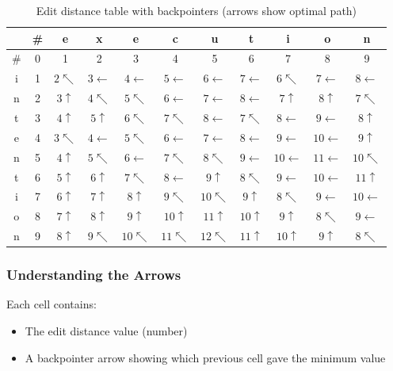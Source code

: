 \documentclass[11pt,a4paper]{article}
\theoremstyle{definition}
\theoremstyle{plain}
\theoremstyle{remark}
\begin{document}
\begin{table}[h]
\centering
\small
\begin{tabular}{|c|c|c|c|c|c|c|c|c|c|c|}
\hline
 & \# & e & x & e & c & u & t & i & o & n \\
\hline
\# & 0 & 1 & 2 & 3 & 4 & 5 & 6 & 7 & 8 & 9 \\
\hline
i & 1 & $2\nwarrow$ & $3\leftarrow$ & $4\leftarrow$ & $5\leftarrow$ & $6\leftarrow$ & $7\leftarrow$ & $6\nwarrow$ & $7\leftarrow$ & $8\leftarrow$ \\
\hline
n & 2 & $3\uparrow$ & $4\nwarrow$ & $5\nwarrow$ & $6\leftarrow$ & $7\leftarrow$ & $8\leftarrow$ & $7\uparrow$ & $8\uparrow$ & $7\nwarrow$ \\
\hline
t & 3 & $4\uparrow$ & $5\uparrow$ & $6\nwarrow$ & $7\nwarrow$ & $8\leftarrow$ & $7\nwarrow$ & $8\leftarrow$ & $9\leftarrow$ & $8\uparrow$ \\
\hline
e & 4 & $3\nwarrow$ & $4\leftarrow$ & $5\nwarrow$ & $6\leftarrow$ & $7\leftarrow$ & $8\leftarrow$ & $9\leftarrow$ & $10\leftarrow$ & $9\uparrow$ \\
\hline
n & 5 & $4\uparrow$ & $5\nwarrow$ & $6\leftarrow$ & $7\nwarrow$ & $8\nwarrow$ & $9\leftarrow$ & $10\leftarrow$ & $11\leftarrow$ & $10\nwarrow$ \\
\hline
t & 6 & $5\uparrow$ & $6\uparrow$ & $7\nwarrow$ & $8\leftarrow$ & $9\uparrow$ & $8\nwarrow$ & $9\leftarrow$ & $10\leftarrow$ & $11\uparrow$ \\
\hline
i & 7 & $6\uparrow$ & $7\uparrow$ & $8\uparrow$ & $9\nwarrow$ & $10\nwarrow$ & $9\uparrow$ & $8\nwarrow$ & $9\leftarrow$ & $10\leftarrow$ \\
\hline
o & 8 & $7\uparrow$ & $8\uparrow$ & $9\uparrow$ & $10\uparrow$ & $11\uparrow$ & $10\uparrow$ & $9\uparrow$ & $8\nwarrow$ & $9\leftarrow$ \\
\hline
n & 9 & $8\uparrow$ & $9\nwarrow$ & $10\nwarrow$ & $11\nwarrow$ & $12\nwarrow$ & $11\uparrow$ & $10\uparrow$ & $9\uparrow$ & \textbf{$8\nwarrow$} \\
\hline
\end{tabular}
\caption{Edit distance table with backpointers (arrows show optimal path)}
\end{table}

\subsubsection{Understanding the Arrows}

Each cell contains:
\begin{itemize}
    \item The edit distance value (number)
    \item A backpointer arrow showing which previous cell gave the minimum value
\end{itemize}
\end{document}
